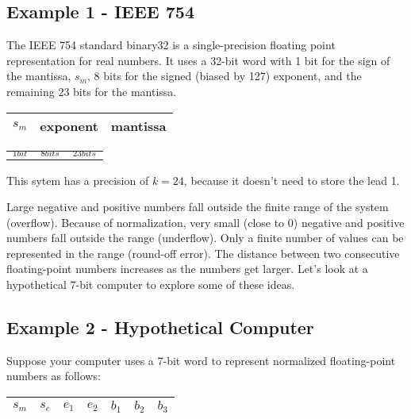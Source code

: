 \documentclass [titlepage,12pt,letter] {article}
\begin{document}
\subsection{Example 1 - IEEE 754}

The IEEE 754 standard binary32 is a single-precision floating point representation for real numbers. It uses a 32-bit word with 1 bit for the sign of the mantissa, $s_m$, 8 bits for the signed (biased by 127) exponent, and the remaining 23 bits for the mantissa.

\begin{center}
\begin{tabular}{ |c|c|c| } 
 \hline
 $s_m$ & exponent & \hspace{0.65 in} mantissa \hspace{0.65 in} \\ 
 \hline
\end{tabular}
\begin{tabular}{ ccc } 
 $_{1 bit}$ & \hspace{0.15 in} $_{8 bits}$ \hspace{0.28 in} & \hspace{0.65 in} $_{23 bits}$ \hspace{0.65 in} \\ 
\end{tabular}
\end{center}

This sytem has a precision of $k=24$, because it doesn't need to store the lead 1.

Large negative and positive numbers fall outside the finite range of the system (overflow). Because of normalization, very small  (close to 0) negative and positive numbers fall outside the range (underflow). Only a finite number of values can be represented in the range (round-off error). The distance between two consecutive floating-point numbers increases as the numbers get larger. Let's look at a hypothetical 7-bit computer to explore some of these ideas.

\subsection{Example 2 - Hypothetical Computer}
Suppose your computer uses a 7-bit word to represent normalized floating-point numbers as follows:

\begin{center}
\begin{tabular}{ |c|c|c|c|c|c|c| } 
 \hline
 $s_m$ & $s_e$ & $e_1$ & $e_2$ & $b_1$ & $b_2$ & $b_3$ \\ 
 \hline
\end{tabular}
\end{center}
\end{document}
